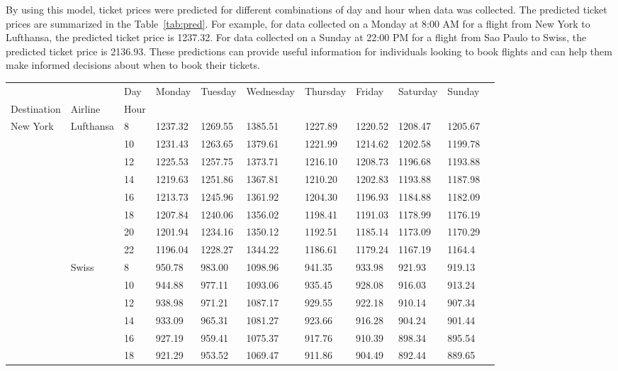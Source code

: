 By using this model, ticket prices were predicted for different combinations of day and hour when data was collected.
The predicted ticket prices are summarized in the Table~\ref{tab:pred}.
For example, for data collected on a Monday at 8:00 AM for a flight from New York to Lufthansa, the predicted ticket price is 1237.32.
For data collected on a Sunday at 22:00 PM for a flight from Sao Paulo to Swiss, the predicted ticket price is 2136.93.
These predictions can provide useful information for individuals looking to book flights and can help them make informed decisions about when to book their tickets.

\begin{table}[h!]
  \centering
  \begin{tabular}{l l l l l l l l l l l}
  & & Day & Monday & Tuesday & Wednesday & Thursday & Friday & Saturday & Sunday \\
  Destination & Airline & Hour & & & & & & & \\
  New York & Lufthansa & 8 & 1237.32 & 1269.55 & 1385.51 & 1227.89 & 1220.52 & 1208.47 & 1205.67 \\
  & & 10 & 1231.43 & 1263.65 & 1379.61 & 1221.99 & 1214.62 & 1202.58 & 1199.78\\
  & & 12 & 1225.53 & 1257.75 & 1373.71 & 1216.10 & 1208.73 &  1196.68 & 1193.88\\
  & & 14 & 1219.63 & 1251.86 & 1367.81 & 1210.20 & 1202.83 & 1193.88 & 1187.98\\
  & & 16 & 1213.73 & 1245.96 & 1361.92 & 1204.30 & 1196.93 & 1184.88 & 1182.09 \\
  & & 18 & 1207.84 & 1240.06 & 1356.02 & 1198.41 & 1191.03 & 1178.99 & 1176.19 \\
  & & 20 & 1201.94 & 1234.16 & 1350.12 & 1192.51 & 1185.14 & 1173.09 & 1170.29 \\
  & & 22 & 1196.04 & 1228.27 & 1344.22 & 1186.61 & 1179.24 & 1167.19 & 1164.4 \\
  & Swiss & 8 & 950.78 & 983.00 & 1098.96 & 941.35 & 933.98 & 921.93 & 919.13\\
  & & 10 & 944.88 & 977.11 & 1093.06 & 935.45 & 928.08 & 916.03 & 913.24\\
  & & 12 & 938.98 & 971.21 & 1087.17 & 929.55 & 922.18 & 910.14 & 907.34\\
  & & 14 & 933.09 & 965.31 & 1081.27 & 923.66 & 916.28 & 904.24 & 901.44\\
  & & 16 & 927.19 & 959.41 & 1075.37 & 917.76 & 910.39 & 898.34 & 895.54\\
  & & 18 & 921.29 & 953.52 & 1069.47 & 911.86 & 904.49 & 892.44 & 889.65\\

\end{tabular}
\end{table}
